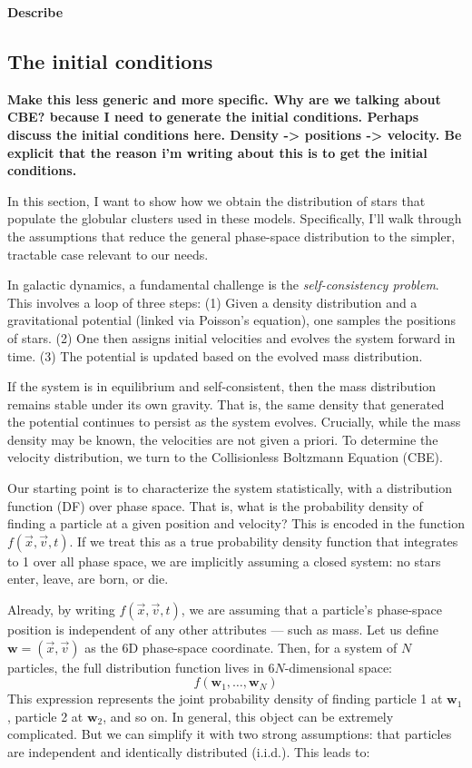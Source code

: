         \textbf{Describe }
    
    \subsection{The initial conditions}\label{subsec:initialconditions}

        \textbf{Make this less generic and more specific. Why are we talking about CBE? because I need to generate the initial conditions. Perhaps discuss the initial conditions here.  Density -> positions -> velocity. Be explicit that the reason i'm writing about this is to get the initial conditions.}

        In this section, I want to show how we obtain the distribution of stars that populate the globular clusters used in these models. Specifically, I'll walk through the assumptions that reduce the general phase-space distribution to the simpler, tractable case relevant to our needs.

        In galactic dynamics, a fundamental challenge is the \textit{self-consistency problem}. This involves a loop of three steps:  
        (1) Given a density distribution and a gravitational potential (linked via Poisson's equation), one samples the positions of stars.  
        (2) One then assigns initial velocities and evolves the system forward in time.  
        (3) The potential is updated based on the evolved mass distribution.  

        If the system is in equilibrium and self-consistent, then the mass distribution remains stable under its own gravity. That is, the same density that generated the potential continues to persist as the system evolves. Crucially, while the mass density may be known, the velocities are not given a priori. To determine the velocity distribution, we turn to the Collisionless Boltzmann Equation (CBE).

        Our starting point is to characterize the system statistically, with a distribution function (DF) over phase space. That is, what is the probability density of finding a particle at a given position and velocity? This is encoded in the function \( f(\vec{x}, \vec{v}, t) \). If we treat this as a true probability density function that integrates to 1 over all phase space, we are implicitly assuming a closed system: no stars enter, leave, are born, or die.

        Already, by writing \( f(\vec{x}, \vec{v}, t) \), we are assuming that a particle's phase-space position is independent of any other attributes — such as mass. Let us define \( \mathbf{w} = (\vec{x}, \vec{v}) \) as the 6D phase-space coordinate. Then, for a system of \( N \) particles, the full distribution function lives in \(6N\)-dimensional space:  
        \[
        f(\mathbf{w}_1, \dots, \mathbf{w}_N)
        \]  
        This expression represents the joint probability density of finding particle 1 at \( \mathbf{w}_1 \), particle 2 at \( \mathbf{w}_2 \), and so on. In general, this object can be extremely complicated. But we can simplify it with two strong assumptions: that particles are independent and identically distributed (i.i.d.). This leads to:

